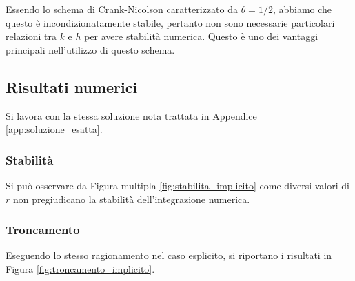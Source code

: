 \documentclass[10pt,a4paper]{article}
\begin{document}
Essendo lo schema di Crank-Nicolson caratterizzato da $\theta = 1/2$, abbiamo che questo è incondizionatamente stabile, pertanto non sono necessarie particolari relazioni tra $k$ e $h$ per avere stabilità numerica. Questo è uno dei vantaggi principali nell'utilizzo di questo schema.

\subsection{Risultati numerici}
 
Si lavora con la stessa soluzione nota trattata in Appendice \ref{app:soluzione_esatta}.

\subsubsection{Stabilità}

Si può osservare da Figura multipla \ref{fig:stabilita_implicito} come diversi valori di $r$ non pregiudicano la stabilità dell'integrazione numerica.

\subsubsection{Troncamento}
\label{subsec:tronc_imp}

Eseguendo lo stesso ragionamento nel caso esplicito, si riportano i risultati in Figura \ref{fig:troncamento_implicito}.
\end{document}
